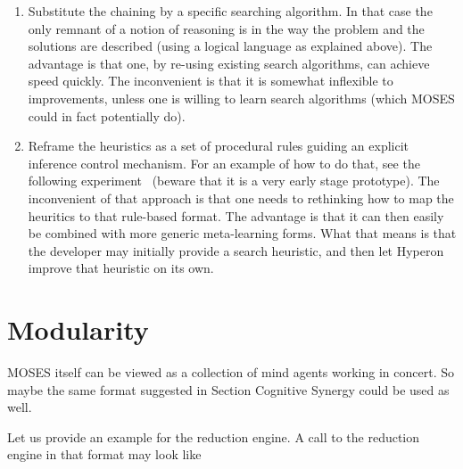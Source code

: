\documentclass[]{report}
\begin{document}
\begin{enumerate}
\begin{enumerate}
   \item Substitute the chaining by a specific searching algorithm.  In
      that case the only remnant of a notion of reasoning is in the
      way the problem and the solutions are described (using a logical
      language as explained above).  The advantage is that one, by
      re-using existing search algorithms, can achieve speed quickly.
      The inconvenient is that it is somewhat inflexible to
      improvements, unless one is willing to learn search algorithms
      (which MOSES could in fact potentially do).
   \item Reframe the heuristics as a set of procedural rules guiding an
      explicit inference control mechanism.  For an example of how to
      do that, see the following experiment~\cite{InfControl}
      (beware that it is a very early stage prototype).  The
      inconvenient of that approach is that one needs to rethinking
      how to map the heuritics to that rule-based format.  The
      advantage is that it can then easily be combined with more
      generic meta-learning forms.  What that means is that the
      developer may initially provide a search heuristic, and then let
      Hyperon improve that heuristic on its own.
   \end{enumerate}
\end{enumerate}

\section{Modularity}

MOSES itself can be viewed as a collection of mind agents working in
concert.  So maybe the same format suggested in Section Cognitive
Synergy could be used as well.

Let us provide an example for the reduction engine.  A call to the
reduction engine in that format may look like
\end{document}
